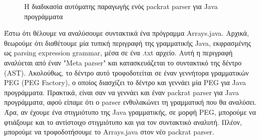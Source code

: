 \begin{figure}[h]
\caption{Η διαδικασία αυτόματης παραγωγής ενός packrat parser για Java προγράμματα}
\label{fig:peg_factory_pipeline}
\end{figure}

Έστω ότι θέλουμε να αναλύσουμε συντακτικά ένα πρόγραμμα Arrays.java. 
Αρχικά, θεωρούμε ότι διαθέτουμε μία τυπική περιγραφή της γραμματικής Java, εκφρασμένης ως parsing expression grammar, μέσα σε ένα .txt αρχείο.
Αυτή η περιγραφή αναλύεται από έναν "Meta parser" και κατασκευάζεται το συντακτικό της δέντρο (AST). 
Ακολούθως, το δέντρο αυτό τροφοδοτείται σε έναν γεννήτορα γραμματικών PEG (PEG Factory), ο οποίος διασχίζει το δέντρο και γεννάει μία PEG για Java προγράμματα.
Πρακτικά, είναι σαν να γεννάει και έναν packrat parser για Java προγράμματα, αφού είπαμε ότι ο parser ενθυλακώνει τη γραμματική που θα αναλύσει.
Άρα, αν έχουμε ένα στιγμιότυπο της Java γραμματικής, σε μορφή PEG, μπορούμε να φτιάξουμε και το αντίστοιχο στιγμιότυπο και για τον συντακτικό αναλυτή.
Πλέον, μπορούμε να τροφοδοτήσουμε το Arrays.java στον νέο packrat parser.

